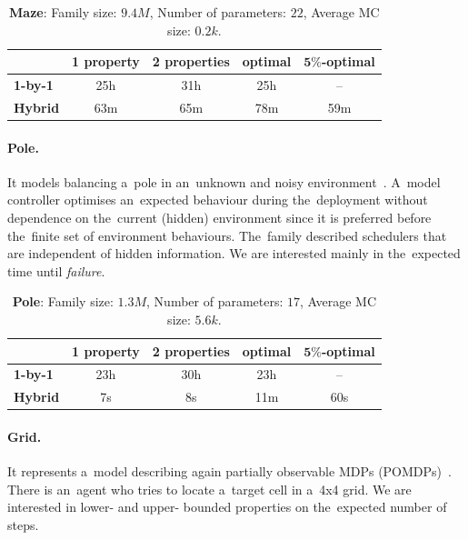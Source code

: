 \begin{table}[h!]
\centering
\begin{tabular}{l|cccc}
    \hline \hline 
    & \multicolumn{1}{l}{\textbf{1 property}} & \multicolumn{1}{l}{\textbf{2 properties}} & \multicolumn{1}{l}{\textbf{optimal}} & \multicolumn{1}{l}{\textbf{$\mathbf{5\%}$-optimal}} \\ \hline
    \textbf{1-by-1} & 25h & 31h & 25h & \,--\, \\
    \textbf{Hybrid} & 63m & 65m & 78m & 59m \\ \hline \hline
\end{tabular}
\caption{\textbf{Maze}:  Family size: $9.4M$, Number of parameters: $22$, Average MC size: $0.2k$.}
\end{table}

\paragraph{Pole.}
It models balancing a~pole in an~unknown and noisy environment~\cite{pole}.
A~model controller optimises an~expected behaviour during the~deployment without dependence on the~current (hidden) environment since it is preferred before the~finite set of environment behaviours.
The~family described schedulers that are independent of hidden information.
We are interested mainly in the~expected time until \emph{failure}.

\begin{table}[h!]
\centering
\begin{tabular}{l|cccc}
    \hline \hline 
    & \multicolumn{1}{l}{\textbf{1 property}} & \multicolumn{1}{l}{\textbf{2 properties}} & \multicolumn{1}{l}{\textbf{optimal}} & \multicolumn{1}{l}{\textbf{$\mathbf{5\%}$-optimal}} \\ \hline
    \textbf{1-by-1} & 23h & 30h & 23h & \,--\, \\
    \textbf{Hybrid} & 7s & 8s & 11m & 60s \\ \hline \hline
\end{tabular}
\caption{\textbf{Pole}:  Family size: $1.3M$, Number of parameters: $17$, Average MC size: $5.6k$.}
\end{table}

\paragraph{Grid.}
It represents a~model describing again partially observable MDPs (POMDPs)~\cite{pomdp1}.
There is an~agent who tries to locate a~target cell in a~4x4 grid.
We are interested in lower- and upper- bounded properties on the~expected number of steps.

